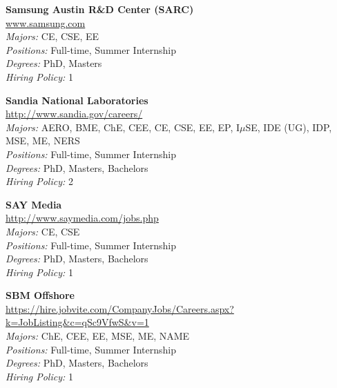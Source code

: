 \documentclass[twoside]{article}
\begin{document}
\begin{center}
\begin{multicols}{3}
\begin{minipage}{.9\columnwidth}{\Large\bf Samsung Austin R\&D Center (SARC) }\\
	\url{www.samsung.com}\\
	\emph{Majors:} CE, CSE, EE\\
	\emph{Positions:} Full-time, Summer Internship\\
	\emph{Degrees:} PhD, Masters\\
	\emph{Hiring Policy:} 1\\
\end{minipage}
 
\begin{minipage}{.9\columnwidth}{\Large\bf Sandia National Laboratories }\\
	\url{http://www.sandia.gov/careers/}\\
	\emph{Majors:} AERO, BME, ChE, CEE, CE, CSE, EE, EP, I$\mu$SE, IDE (UG), IDP, MSE, ME, NERS\\
	\emph{Positions:} Full-time, Summer Internship\\
	\emph{Degrees:} PhD, Masters, Bachelors\\
	\emph{Hiring Policy:} 2\\
\end{minipage}
 
\begin{minipage}{.9\columnwidth}{\Large\bf SAY Media }\\
	\url{http://www.saymedia.com/jobs.php}\\
	\emph{Majors:} CE, CSE\\
	\emph{Positions:} Full-time, Summer Internship\\
	\emph{Degrees:} PhD, Masters, Bachelors\\
	\emph{Hiring Policy:} 1\\
\end{minipage}
 
\begin{minipage}{.9\columnwidth}{\Large\bf SBM Offshore }\\
	\url{https://hire.jobvite.com/CompanyJobs/Careers.aspx?k=JobListing&c=qSc9VfwS&v=1}\\
	\emph{Majors:} ChE, CEE, EE, MSE, ME, NAME\\
	\emph{Positions:} Full-time, Summer Internship\\
	\emph{Degrees:} PhD, Masters, Bachelors\\
	\emph{Hiring Policy:} 1\\
\end{minipage}
 

\end{multicols}
\end{center}
\end{document}
